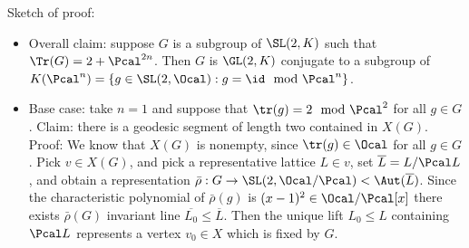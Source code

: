  Sketch of proof:
 \begin{itemize}
 \item Overall claim: suppose $G$ is a subgroup of $\SL(2,K)$ such that $\Tr(G) = 2 + \Pcal^{2n}$. Then $G$ is $\GL(2,K)$ conjugate to a subgroup of $K(\Pcal^n) = \{ g \in \SL(2,\Ocal) : g = \id \mod \Pcal^{n}\}$.
 \item Base case: take $n=1$ and suppose that $\tr(g) = 2 \mod \Pcal^{2}$ for all $g\in G$.
 \subitem Claim: there is a geodesic segment of length two contained in $X(G)$.
 \subitem Proof: We know that $X(G)$ is nonempty, since $\tr(g) \in \Ocal$ for all $g\in G$. Pick $v \in X(G)$, and pick a representative lattice $L \in v$,  set $\overline{L} = L / \Pcal L$, and  obtain a representation $\bar{\rho}: G \to \SL(2,\Ocal/\Pcal) < \Aut(\overline{L})$. Since the characteristic polynomial of $\bar{\rho}(g)$ is $(x-1)^2 \in \Ocal /\Pcal [x]$ there exists $\bar{\rho}(G)$ invariant line $\overline{L_0} \leq \overline{L}$. Then the unique lift $L_0 \leq L$ containing $\Pcal L$ represents a vertex $v_0 \in X$ which is fixed by $G$.
 \end{itemize}


















